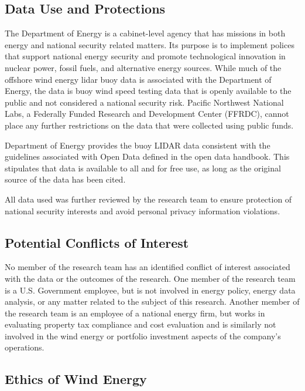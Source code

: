 \documentclass{llncs}
\begin{document}
\subsection{Data Use and Protections}

The Department of Energy is a cabinet-level agency that has missions in both energy and national security related matters. Its purpose is to implement polices that support national energy security and promote technological innovation in nuclear power, fossil fuels, and alternative energy sources. While much of the offshore wind energy lidar buoy data is associated with the Department of Energy, the data is buoy wind speed testing data that is openly available to the public and not considered a national security risk. Pacific Northwest National Labs, a Federally Funded Research and Development Center (FFRDC), cannot place any further restrictions on the data that were collected using public funds.

Department of Energy provides the buoy LIDAR data consistent with the guidelines associated with Open Data defined in the open data handbook. \cite{opendatahandbook} This stipulates that data is available to all and for free use, as long as the original source of the data has been cited.

All data used was further reviewed by the research team to ensure protection of national security interests and avoid personal privacy information violations.

\subsection{Potential Conflicts of Interest}

No member of the research team has an identified conflict of interest associated with the data or the outcomes of the research. One member of the research team is a U.S. Government employee, but is not involved in energy policy, energy data analysis, or any matter related to the subject of this research. Another member of the research team is an employee of a national energy firm, but works in evaluating property tax compliance and cost evaluation and is similarly not involved in the wind energy or portfolio investment aspects of the company's operations.

\subsection{Ethics of Wind Energy}
\end{document}

